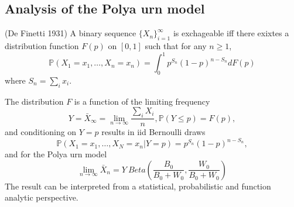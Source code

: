 \documentclass[a4paper,english,12pt]{article}
\begin{document}
\subsection{Analysis of the Polya urn model}
\begin{thm}(De Finetti 1931)
A binary sequence $\{X_n\}_{i=1}^{\infty}$ is exchageable iff there exixtes a distribution function $F(p)$ on $[0,1]$ such that for any $n\geq1$,
\begin{equation*}
\mathbb{P}(X_1=x_1,\dots,X_n=x_n)=\int_0^1 p^{S_n}(1-p)^{n-S_n}dF(p)
\end{equation*}
where $S_n=\sum_i x_i$.
\end{thm}
The distribution $F$ is a function of the limiting frequency
\begin{equation*}
Y=\bar{X}_{\infty}=\lim_{n \to \infty}\frac{\sum_i X_i}{n},  \mathbb{P}(Y\leq p)=F(p),
\end{equation*}
and conditioning on $Y=p$ results in iid Bernoulli draws
\begin{equation*}
\mathbb{P}(X_1=x_1,\dots,X_N=x_n|Y=p)= p^{S_n}(1-p)^{n-S_n},
\end{equation*}
and for the Polya urn model
\begin{equation*}
\lim_{n\to \infty} \bar{X}_n=Y~Beta\left(\frac{B_0}{B_0+W_0},\frac{W_0}{B_0+W_0} \right)
\end{equation*}
The result can be interpreted from a statistical, probabilistic and function analytic perspective.
\end{document}
